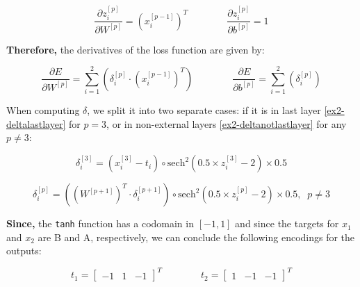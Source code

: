 \documentclass[12pt]{article}
\begin{document}
\begin{enumerate}[leftmargin=\labelsep]
          \begin{equation*}
              \frac{\partial z^{[p]}_i}{\partial W^{[p]}} = \left(x^{[p-1]}_i\right)^{T} \qquad\qquad
              \frac{\partial z^{[p]}_i}{\partial b^{[p]}} = 1
          \end{equation*}

          \textbf{Therefore,} the derivatives of the loss function are given by:

          \begin{equation}\label{ex2-derivate-loss-smiplified}
            \frac{\partial E}{\partial W^{[p]}} = \sum_{i=1}^{2} \left(\delta^{[p]}_i \cdot \left(x^{[p-1]}_i\right)^{T} \right) \qquad\qquad
            \frac{\partial E}{\partial b^{[p]}} = \sum_{i=1}^{2} \left(\delta^{[p]}_i\right)
          \end{equation}

          When computing \(\delta\), we split it into two separate cases: if it is in  last layer \eqref{ex2-deltalastlayer} for $p = 3$, or in non-external
          layers \eqref{ex2-deltanotlastlayer} for any $p \neq 3$:

          \begin{equation}\label{ex2-deltalastlayer}
              \delta^{[3]}_i = \left(x^{[3]}_i - t_i\right) \circ \text{sech}^{2}\left(0.5 \times z^{[3]}_i - 2\right) \times 0.5
          \end{equation}

          \begin{equation}\label{ex2-deltanotlastlayer}
              \delta^{[p]}_i = \left(\left(W^{[p+1]}\right)^{T} \cdot \delta^{[p+1]}_i\right) \circ \text{sech}^{2}\left(0.5 \times z^{[p]}_i - 2\right) \times 0.5, \;\; p \neq 3
          \end{equation}

          \textbf{Since,} the \texttt{tanh} function has a codomain in $[-1,1]$ and since the targets for $x_1$ and $x_2$ are B and A, respectively, we can
          conclude the following encodings for the outputs:

          \begin{equation*}
              t_1 = \begin{bmatrix} -1 & 1 & -1\end{bmatrix}^T \qquad\qquad
              t_2 = \begin{bmatrix} 1 & -1 & -1\end{bmatrix}^T
          \end{equation*}


\end{enumerate}
\end{document}
